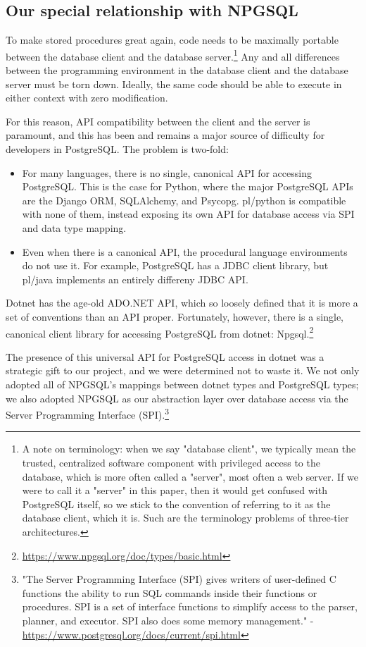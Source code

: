 \documentclass[sigconf,techreport,authorversion,nonacm]{acmart}
\begin{document}
\subsection{Our special relationship with NPGSQL}

To make stored procedures great again, code needs to be maximally portable
between the database client and the database server.\footnote{A note on terminology: when we say "database client", we typically mean the trusted, centralized software component with privileged access to the database, which is more often called a "server", most often a web server.  If we were to call it a "server" in this paper, then it would get confused with PostgreSQL itself, so we stick to the convention of referring to it as the database client, which it is.  Such are the terminology problems of three-tier architectures.}
Any and all differences between the programming environment in the
database client and the database server must be torn down.  Ideally,
the same code should be able to execute in either context with zero
modification.

For this reason, API compatibility between the client and the server
is paramount, and this has been and remains a major source of difficulty
for developers in PostgreSQL.  The problem is two-fold:

\begin{itemize}[itemsep=0pt]
    \item For many languages, there is no single, canonical API for accessing PostgreSQL.  This is the case for Python, where the major PostgreSQL APIs are the Django ORM, SQLAlchemy, and Psycopg.  pl/python is compatible with none of them, instead exposing its own API for database access via SPI and data type mapping.
    \item Even when there is a canonical API, the procedural language environments do not use it.  For example, PostgreSQL has a JDBC client library, but pl/java implements an entirely differeny JDBC API.
\end{itemize}

Dotnet has the age-old ADO.NET API, which so loosely defined that it is
more a set of conventions than an API proper.  Fortunately, however,
there is a single, canonical client library for accessing PostgreSQL
from dotnet: Npgsql.\footnote{\url{https://www.npgsql.org/doc/types/basic.html}}

The presence of this universal API for PostgreSQL access in dotnet
was a strategic gift to our project, and we were determined not to
waste it.  We not only adopted all of NPGSQL's mappings between
dotnet types and PostgreSQL types; we also adopted NPGSQL as our
abstraction layer over database access via the Server Programming
Interface (SPI).\footnote{"The Server Programming Interface (SPI) gives writers of user-defined C functions the ability to run SQL commands inside their functions or procedures. SPI is a set of interface functions to simplify access to the parser, planner, and executor. SPI also does some memory management." - \url{https://www.postgresql.org/docs/current/spi.html}}
\end{document}
